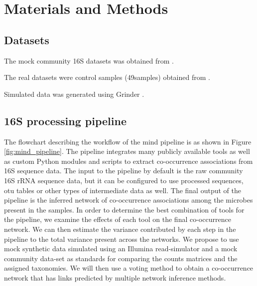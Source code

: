 
\section*{Materials and Methods}

  \subsection*{Datasets}

    \vspace{-5mm}

    The mock community 16S datasets was obtained from \cite{Bokulich2016}.

    The real datasets were control samples (49samples)  obtained from \cite{Kang2017}.

    Simulated data was generated using Grinder \cite{Angly2012}.

  \subsection*{16S processing pipeline}

    \vspace{-5mm}

    The flowchart describing the workflow of the \ac{mind} pipeline is as shown in Figure \ref{fig:mind_pipeline}.
    The pipeline integrates many publicly available tools as well as custom Python modules and scripts to extract co-occurrence associations from 16S sequence data.
    The input to the pipeline by default is the raw community 16S rRNA sequence data, but it can be configured to use processed sequences, \ac{otu} tables or other types of intermediate data as well.
    The final output of the pipeline is the inferred network of co-occurrence associations among the microbes present in the samples.
    In order to determine the best combination of tools for the pipeline, we examine the effects of each tool on the final co-occurrence network.
    We can then estimate the variance contributed by each step in the pipeline to the total variance present across the networks.
    We propose to use mock synthetic data simulated using an Illumina read-simulator \cite{Escalona2016} and a mock community data-set \cite{Bokulich2016} as standards for comparing the counts matrices and the assigned taxonomies.
    We will then use a voting method to obtain a co-occurrence network that has links predicted by multiple network inference methods.

